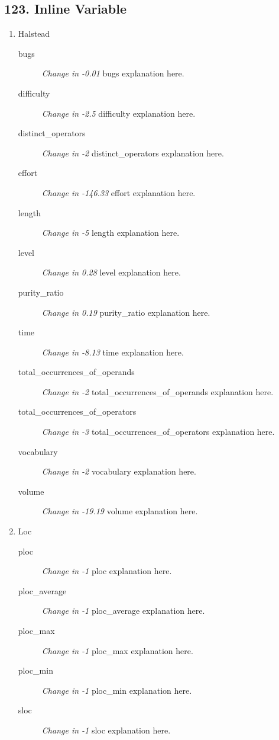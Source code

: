 \subsection{ 123.  Inline Variable }

\begin{enumerate}
  \item Halstead
        \begin{description}
          \item [bugs] \textit{Change in -0.01} bugs explanation here.
          \item [difficulty] \textit{Change in -2.5} difficulty explanation here.
          \item [distinct\_operators] \textit{Change in -2} distinct\_operators explanation here.
          \item [effort] \textit{Change in -146.33} effort explanation here.
          \item [length] \textit{Change in -5} length explanation here.
          \item [level] \textit{Change in 0.28} level explanation here.
          \item [purity\_ratio] \textit{Change in 0.19} purity\_ratio explanation here.
          \item [time] \textit{Change in -8.13} time explanation here.
          \item [total\_occurrences\_of\_operands] \textit{Change in -2} total\_occurrences\_of\_operands explanation here.
          \item [total\_occurrences\_of\_operators] \textit{Change in -3} total\_occurrences\_of\_operators explanation here.
          \item [vocabulary] \textit{Change in -2} vocabulary explanation here.
          \item [volume] \textit{Change in -19.19} volume explanation here.
        \end{description}
  \item Loc
        \begin{description}
          \item [ploc] \textit{Change in -1} ploc explanation here.
          \item [ploc\_average] \textit{Change in -1} ploc\_average explanation here.
          \item [ploc\_max] \textit{Change in -1} ploc\_max explanation here.
          \item [ploc\_min] \textit{Change in -1} ploc\_min explanation here.
          \item [sloc] \textit{Change in -1} sloc explanation here.

\end{description}
\end{enumerate}
